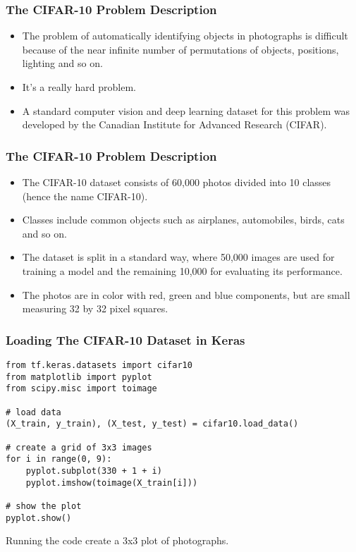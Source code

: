\begin{frame}[fragile] \frametitle{The CIFAR-10 Problem Description}
\begin{itemize}
\item The problem of automatically identifying objects in photographs is difficult because of the near infinite number of permutations of objects, positions, lighting and so on. 
\item It's a really hard problem.
\item  A standard computer vision and deep learning dataset for this problem was developed by the Canadian Institute for Advanced Research (CIFAR).
\end{itemize}
\end{frame}


\begin{frame}[fragile] \frametitle{The CIFAR-10 Problem Description}

\begin{itemize}
\item The CIFAR-10 dataset consists of 60,000 photos divided into 10 classes (hence the name CIFAR-10). 
\item Classes include common objects such as airplanes, automobiles, birds, cats and so on. 
\item The dataset is split in a standard way, where 50,000 images are used for training a model and the remaining 10,000 for evaluating its performance.
\item The photos are in color with red, green and blue components, but are small measuring 32 by 32 pixel squares.
\end{itemize}
\end{frame}


\begin{frame}[fragile] \frametitle{Loading The CIFAR-10 Dataset in Keras}

\begin{lstlisting}
from tf.keras.datasets import cifar10
from matplotlib import pyplot
from scipy.misc import toimage

# load data
(X_train, y_train), (X_test, y_test) = cifar10.load_data()

# create a grid of 3x3 images
for i in range(0, 9):
    pyplot.subplot(330 + 1 + i)
    pyplot.imshow(toimage(X_train[i]))
    
# show the plot
pyplot.show()
\end{lstlisting}
Running the code create a 3x3 plot of photographs.
\end{frame}


